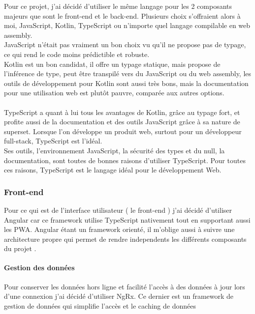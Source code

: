 Pour ce projet, j'ai décidé d'utiliser le même langage pour les 2 composants majeurs que sont le front-end et le back-end.
Plusieurs choix s'offraient alors à moi, JavaScript, Kotlin, TypeScript ou n'importe quel langage compilable en web assembly.\\

JavaScript n'était pas vraiment un bon choix vu qu'il ne propose pas de typage, ce qui rend le code moins prédictible et robuste.\\

Kotlin est un bon candidat, il offre un typage statique, mais propose de l'inférence de type, peut être transpilé vers du JavaScript ou du web assembly,
les outils de développement pour Kotlin sont aussi très bons, mais la documentation pour une utilisation web est plutôt pauvre, comparée aux autres options.\\\\

TypeScript a quant à lui tous les avantages de Kotlin, grâce au typage fort, et profite aussi de la documentation et des outils JavaScript grâce à sa nature de superset.
Lorsque l'on développe un produit web, surtout pour un développeur full-stack, TypeScript est l'idéal.\\
Ses outils, l'environnement JavaScript, la sécurité des types et du null, la documentation, sont toutes de bonnes raisons d'utiliser TypeScript.
Pour toutes ces raisons, TypeScript est le langage idéal pour le développement Web.

\subsubsection{Front-end}\label{subsec:front-end}
Pour ce qui est de l'interface utilisateur ( le front-end ) j'ai décidé d'utiliser Angular car ce framework utilise TypeScript nativement tout en supportant aussi les PWA\@.
Angular étant un framework orienté, il m'oblige aussi à suivre une architecture propre qui permet de rendre independents les différents composants du projet .

\paragraph{Gestion des données}
Pour conserver les données hors ligne et facilité l'accès à des données à jour lors d'une connexion j'ai décidé d'utiliser NgRx.
Ce dernier est un framework de gestion de données qui simplifie l'accès et le caching de données

